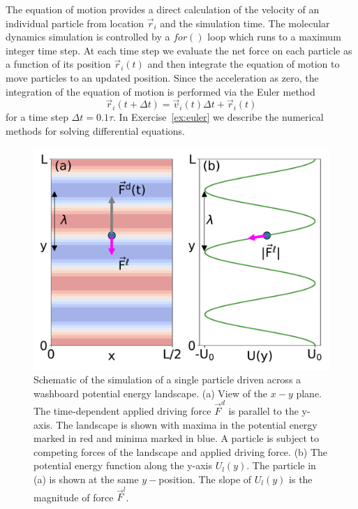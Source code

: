 \documentclass[twocolumn,preprintnumbers,amsmath,amssymb,aps,prb]{revtex4}
\begin{document}
The equation of motion provides a direct calculation of the velocity
of an individual particle from location $\vec{r}_i$ 
and the simulation time.
The molecular dynamics simulation is controlled by a $for()$ loop
which runs to a maximum integer time step.
At each time step
we evaluate the net force on each particle as a function of its position
$\vec{r}_i(t)$
and then integrate
the equation of motion to move particles
to an updated position.
Since the acceleration as zero,
the integration of the equation of motion
is performed via 
the Euler method 
\begin{equation}
  \vec{r}_i(t+\Delta t) = \vec{v}_i(t) \Delta t + \vec{r}_i(t)
    \label{eq:euler}
\end{equation}
for a time step $\Delta t = 0.1 \tau$.
In 
Exercise~\ref{ex:euler}
we describe 
the numerical methods for 
solving differential equations.
\begin{figure} %
\centering
\includegraphics[width=\columnwidth]{fig1_landscape.pdf}
\caption{
  Schematic of the simulation of a single particle
  driven across a washboard potential energy landscape.
  (a) View of the $x-y$ plane. 
  The time-dependent applied driving force $\vec{F}^d$
  is parallel to the y-axis.
  The landscape is shown with 
  maxima in the potential energy marked in red
  and minima marked in blue.
  A particle is 
  subject to competing forces of the landscape and applied driving force.
  (b) The potential energy function
  along the y-axis $U_l(y)$.  
  The particle in (a) is shown at the same $y-$position.
  The slope of $U_l(y)$ is the 
  magnitude of force $\vec{F}^l$. 
  }
\label{fig:1_landscape}
\end{figure}
%
\end{document}
